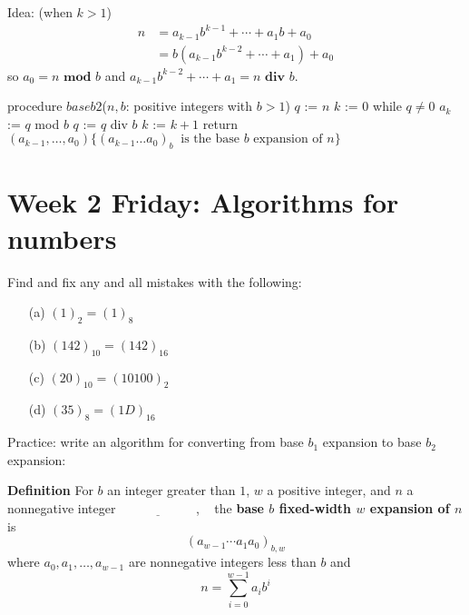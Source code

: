 \documentclass[12pt, oneside]{article}
\begin{document}
Idea: {\tiny(when $k > 1$)} 
    \begin{align*}
      n &= a_{k-1} b^{k-1} + \cdots + a_1 b + a_0 \\
        &= b ( a_{k-1} b^{k-2} + \cdots + a_1) + a_0\end{align*}
    so $a_0 = n \textbf{ mod } b$ and $a_{k-1} b^{k-2} + \cdots + a_1 = n \textbf{ div } b$.
\begin{algorithm}[caption={Calculating base $b$ expansion, from right}]
procedure $\textit{baseb2}$($n, b$: positive integers with $b > 1$)
$q$ := $n$
$k$ := $0$
while $q  \neq 0$
  $a_{k}$ := $q$ mod $b$
  $q$ := $q$ div $b$
  $k$ := $k+1$
return $(a_{k-1}, \ldots, a_0) \{(a_{k-1} \ldots a_0)_b~\textrm{ is the base } b \textrm{ expansion of } n \}$
\end{algorithm}


\vfill
\vfill
\newpage 

\newpage
\section*{Week 2 Friday: Algorithms for numbers}


Find and fix any and all mistakes with the following:
\begin{itemize}
\item[(a)] $(1)_2 = (1)_8$
\item[(b)] $(142)_{10} = (142)_{16}$
\item[(c)] $(20)_{10} = (10100)_2$
\item[(d)] $(35)_8 = (1D)_{16}$
\end{itemize} 



Practice: write an algorithm for converting from base $b_1$ expansion to base $b_2$ expansion:

\phantom{
Earlier, we saw (two different) algorithms for, given 
a target base $b$, converting from decimal to base $b$ expansions. 
We will use either one of these as a subroutine in this algorithm.\\
Given a base expansion in base $b_1$:\\
Step 1: Use the definition of base expansion to calculate the value of
    this number (in decimal).\\
Step 2: Use the Least Significant First algorithm to write this value in 
    base $b_2$ and output the result.
}
\vspace{200pt} 

{\bf Definition} For $b$ an integer greater than $1$, $w$ a positive integer, 
and $n$ a nonnegative integer
$\underline{\phantom{\hspace{1in}}}$, ~
the {\bf base $b$ fixed-width $w$ expansion of $n$}  is
\[
(a_{w-1} \cdots a_1 a_0)_{b,w}
\]
where  $a_0, a_1, \ldots, a_{w-1}$ are nonnegative integers less than $b$ and
\[
n =  \sum_{i=0}^{w-1} a_{i} b^{i}
\]
 
\end{document}
